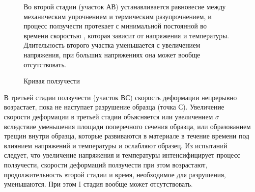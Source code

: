 	\begin{figure}[h!]
		\begin{minipage}[h]{0.48\linewidth}
			\caption{Кривая ползучести} 
		\end{minipage}
		\hfill
		\begin{minipage}[h]{0.48\linewidth}
Во второй стадии (участок АВ) устанавливается равновесие между механическим 
упрочнением и термическим разупрочнением, и процесс ползучести протекает с 	минимальной 
постоянной во времени скоростью , которая зависит от напряжения и 
температуры. Длительность второго участка уменьшается с увеличением напряжения, при 
больших напряжениях она может вообще отсутствовать.
		
		\end{minipage}
		\label{intro_creep}
	\end{figure}
		
В третьей стадии ползучести (участок ВС) скорость деформации непрерывно возрастает, пока 
не наступает разрушение образца (точка С).
Увеличение скорости деформации в третьей стадии объясняется или увеличением $\sigma$ 
вследствие уменьшения площади поперечного сечения образца, или образованием трещин внутри 
образца, которые развиваются в материале в течение времени под влиянием напряжений и 
температуры и ослабляют образец.
Из испытаний следует, что увеличение напряжения и температуры интенсифицирует процесс 
ползучести, скорости деформаций ползучести при этом возрастают, продолжительность второй 
стадии и время, необходимое для разрушения, уменьшаются. При этом I стадия вообще может 
отсутствовать.

